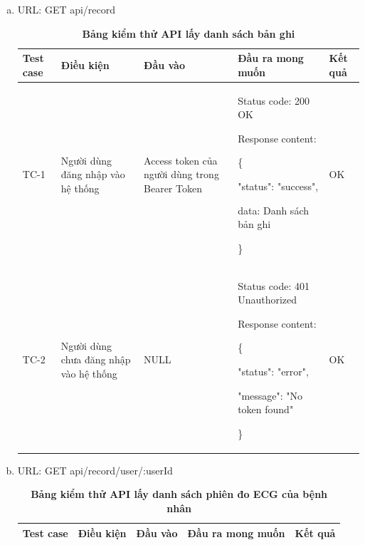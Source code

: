 \begin{enumerate}[a)]
  \item URL: GET api/record
    
  \begin{xltabular}{\textwidth}{
    | >{\raggedright\arraybackslash}p{1cm}
    | >{\raggedright\arraybackslash}p{2.5cm}
    | >{\raggedright\arraybackslash}p{2.5cm}
    | >{\raggedright\arraybackslash}X
    | >{\raggedright\arraybackslash}p{1cm}|
    }
    \caption{\bfseries \fontsize{12pt}{0pt}\selectfont Bảng kiểm thử API lấy danh sách bản ghi}
    \\
    \hline
    \bfseries Test case    &\bfseries Điều kiện   &\bfseries Đầu vào 
    &\bfseries Đầu ra mong muốn &\bfseries Kết quả\\ \hline
  
  
    TC-1
    & Người dùng đăng nhập vào hệ thống
    & Access token của người dùng trong Bearer Token
  
    & 
  
    Status code: 200 OK
  
      Response content:
  
      \{
  
    "status": "success",
  
    data: Danh sách bản ghi 
  
    \}
    
    & OK
  
    \\ \hline
  
    TC-2
    & Người dùng chưa đăng nhập vào hệ thống
    & NULL
  
    & 
  
    Status code: 401 Unauthorized
  
      Response content:
  
      \{
  
    "status": "error",
  
    "message": "No token found"
  
    \}
    
    & OK
    \\ \hline

  
    \end{xltabular}

  
  \item URL: GET api/record/user/{:userId}
  
  \begin{xltabular}{\textwidth}{
    | >{\raggedright\arraybackslash}p{1cm}
    | >{\raggedright\arraybackslash}p{2.5cm}
    | >{\raggedright\arraybackslash}p{2.5cm}
    | >{\raggedright\arraybackslash}X
    | >{\raggedright\arraybackslash}p{1cm}|
    }
    \caption{\bfseries \fontsize{12pt}{0pt}\selectfont Bảng kiểm thử API lấy danh sách phiên đo ECG của bệnh nhân}
    \\
    \hline
    \bfseries Test case    &\bfseries Điều kiện   &\bfseries Đầu vào 
    &\bfseries Đầu ra mong muốn &\bfseries Kết quả\\ \hline
  

\end{xltabular}
\end{enumerate}
